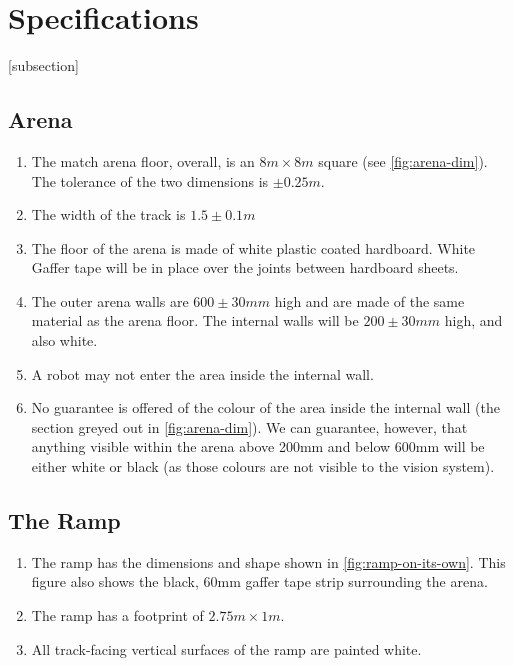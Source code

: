 \section{Specifications}
\label{sec:Specifications}

[subsection]
\newcommand{\rcnii}{\stepcounter{rulei}\arabic{section}.\arabic{subsection}.\arabic{rulei}}
\renewcommand{\labelenumi}{\rcnii}

\subsection{Arena}
\begin{enumerate}
\item The match arena floor, overall, is an $8m \times 8m$ square (see \autoref{fig:arena-dim}).
 The tolerance of the two dimensions is $\pm0.25m$.
\item The width of the track is $1.5\pm0.1m$
\item The floor of the arena is made of white plastic coated hardboard.
 White Gaffer tape will be in place over the joints between hardboard sheets.
\item The outer arena walls are $600\pm30mm$ high and are made of the same material as the arena floor.
 The internal walls will be $200\pm30mm$ high, and also white.
\item A robot may not enter the area inside the internal wall.
\item No guarantee is offered of the colour of the area inside the internal wall (the section greyed out in \autoref{fig:arena-dim}).
 We can guarantee, however, that anything visible within the arena above 200mm and below 600mm will be either white or black (as those colours are not visible to the vision system).
\end{enumerate}

\subsection{The Ramp}
\label{sub:Ramp}
\begin {enumerate}
\item The ramp has the dimensions and shape shown in \autoref{fig:ramp-on-its-own}.
 This figure also shows the black, 60mm gaffer tape strip surrounding the arena.
\item The ramp has a footprint of $2.75m \times 1m$.
\item All track-facing vertical surfaces of the ramp are painted white.
\end {enumerate}

